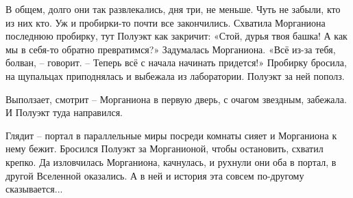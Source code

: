 \documentclass[ebook,oneside,final,openright]{memoir}
\begin{document}
\par
В общем, долго они так развлекались, дня три, не меньше. Чуть не забыли, кто из них кто. Уж и пробирки-то почти все закончились. Схватила Морганиона последнюю пробирку, тут Полуэкт как закричит: «Стой, дурья твоя башка! А как мы в себя-то обратно превратимся?» Задумалась Морганиона. «Всё из-за тебя, болван, – говорит. – Теперь всё с начала начинать придется!» Пробирку бросила, на щупальцах приподнялась и выбежала из лаборатории. Полуэкт за ней пополз.\par
\par
Выползает, смотрит – Морганиона в первую дверь, с очагом звездным, забежала. И Полуэкт туда направился.\par
\par
Глядит – портал в параллельные миры посреди комнаты сияет и Морганиона к нему бежит. Бросился Полуэкт за Морганионой, чтобы остановить, схватил крепко. Да изловчилась Морганиона, качнулась, и рухнули они оба в портал, в другой Вселенной оказались. А в ней и история эта совсем по-другому сказывается...\par
\end{document}
